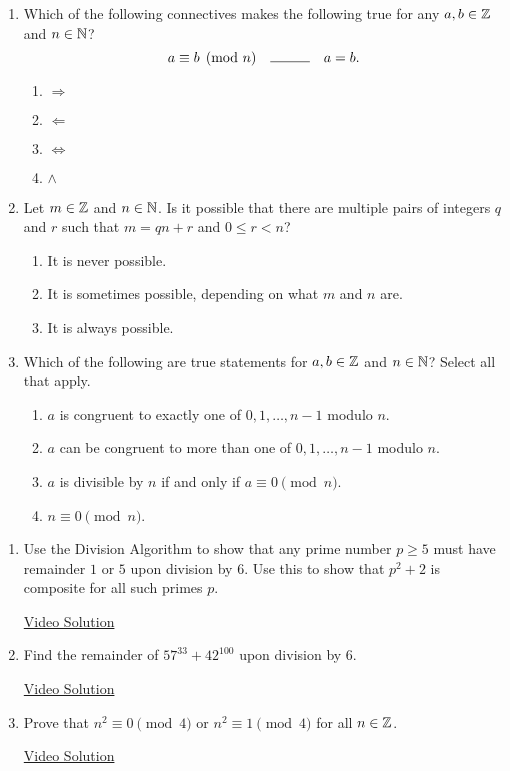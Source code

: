 \pagestyle{empty}


\begin{enumerate}
    \item Which of the following connectives makes the following true for any $a,b \in \mathbb{Z}$ and $n \in \mathbb{N}$?
    \[
        a \equiv b \pmod n \quad \rule{1cm}{0.15mm} \quad a = b.
    \]
    \begin{enumerate}
        \item $\Longrightarrow$
        \item $\Longleftarrow$
        \item $\iff$
        \item $\land$
    \end{enumerate}
    
    \item Let $m \in \mathbb{Z}$ and $n \in \mathbb{N}$. Is it possible that there are multiple pairs of integers $q$ and $r$ such that $m = qn + r$ and $0 \leq r < n$?
    \begin{enumerate}
        \item It is never possible.
        \item It is sometimes possible, depending on what $m$ and $n$ are.
        \item It is always possible.
    \end{enumerate}
    
    \item Which of the following are true statements for $a,b \in \mathbb{Z}$ and $n \in \mathbb{N}$? Select all that apply.
    \begin{enumerate}
        \item $a$ is congruent to exactly one of $0,1,\ldots,n-1$ modulo $n$.
        \item $a$ can be congruent to more than one of $0,1,\ldots,n-1$ modulo $n$.
        \item $a$ is divisible by $n$  if and only if $a \equiv 0 \pmod n$.
        \item $n \equiv 0 \pmod n$.
    \end{enumerate}
\end{enumerate}



\begin{enumerate}
\item Use the Division Algorithm to show that any prime number $p \geq 5$ must have remainder $1$ or $5$ upon division by $6$. Use this to show that $p^2 + 2$ is composite for all such primes $p$.
    
    \href{https://youtu.be/5kSRSP5FHKw}{Video Solution}
    
    \item Find the remainder of $57^{33} + 42^{100}$ upon division by $6$.
    
    \href{https://youtu.be/BQHAWJmsEAU}{Video Solution}
    
    \item Prove that $n^2 \equiv 0 \pmod 4$ or $n^2 \equiv 1 \pmod 4$ for all $n \in \mathbb{Z}$.
    
    \href{https://youtu.be/st9pXz2agyw}{Video Solution}
\end{enumerate}